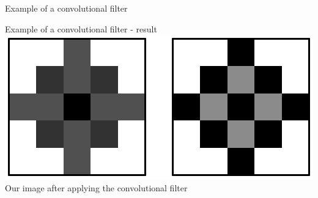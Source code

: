 \documentclass[9pt, aspectratio=169]{beamer}
\begin{document}
\begin{frame}
    {Example of a convolutional filter}
    \centering
\end{frame}

\begin{frame}
    {Example of a convolutional filter - result}
    \centering
    \includegraphics[width=.6\textwidth]{example_filter_before_after.png}\\

    Our image after applying the convolutional filter
\end{frame}
\end{document}
